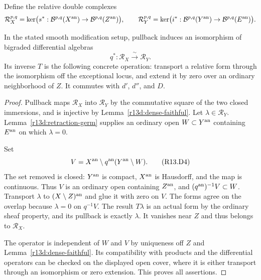 Define the relative double complexes
\[
 \mathcal R_X^{p,q}=
       \ker\bigl(s^*:\mathcal B^{p,q}(X^{\rm an})
                              \to\mathcal B^{p,q}(Z^{\rm an})\bigr),
 \qquad
 \mathcal R_Y^{p,q}=
       \ker\bigl(i^*:\mathcal B^{p,q}(Y^{\rm an})
                              \to\mathcal B^{p,q}(E^{\rm an})\bigr).
\]

\begin{proposition}
\label{r13d:relative-isomorphism}
In the stated smooth modification setup, pullback induces an isomorphism
of bigraded differential algebras
\[
                          q^*:\mathcal R_X\xrightarrow{\ \sim\ }
                                      \mathcal R_Y.
\tag{R13.D3}\label{r13d:relative-isom}
\]
Its inverse $T$ is the following concrete operation: transport a
relative form through the isomorphism off the exceptional locus,
and extend it by zero over an ordinary neighborhood of $Z$.
It commutes with $d'$, $d''$, and $D$.
\end{proposition}

\begin{proof}
Pullback maps $\mathcal R_X$ into $\mathcal R_Y$ by the commutative
square of the two closed immersions, and is injective by
Lemma~\ref{r13d:dense-faithful}.  Let $\lambda\in\mathcal R_Y$.
Lemma~\ref{r13d:retraction-germ} supplies an ordinary open
$W\subset Y^{\rm an}$ containing $E^{\rm an}$ on which
$\lambda=0$.

Set
\[
                 V=X^{\rm an}\setminus
                        q^{\rm an}(Y^{\rm an}\setminus W).
\tag{R13.D4}\label{r13d:saturated-neighborhood}
\]
The set removed is closed: $Y^{\rm an}$ is compact, $X^{\rm an}$ is
Hausdorff, and the map is continuous.  Thus $V$ is an ordinary open
containing $Z^{\rm an}$, and $(q^{\rm an})^{-1}V\subset W$.
Transport $\lambda$ to $(X\setminus Z)^{\rm an}$ and glue it with
zero on $V$.  The forms agree on the overlap because $\lambda=0$
on $q^{-1}V$.  The result $T\lambda$ is an actual form by the
ordinary sheaf property, and its pullback is exactly $\lambda$.
It vanishes near $Z$ and thus belongs to $\mathcal R_X$.

The operator is independent of $W$ and $V$ by uniqueness off $Z$
and Lemma~\ref{r13d:dense-faithful}.  Its compatibility with products
and the differential operators can be checked on the displayed open
cover, where it is either transport through an isomorphism or zero
extension.  This proves all assertions.
\end{proof}

